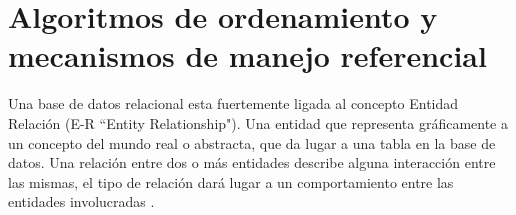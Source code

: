 
\chapter{Algoritmos de ordenamiento y mecanismos de manejo referencial}
\label{Algoritmos de ordenamiento y mecanismos del manejo referencial}
Una base de datos relacional esta fuertemente ligada al concepto Entidad Relaci\'on \cite{FBD}(E-R ``Entity Relationship"). Una entidad que representa gr\'aficamente a un concepto del mundo real o abstracta, que da lugar a una tabla en la base de datos. Una relaci\'on entre dos o m\'as entidades describe alguna interacci\'on entre las mismas, el tipo de relaci\'on  dar\'a lugar a un comportamiento entre las entidades involucradas \cite{introbasedatos}.

